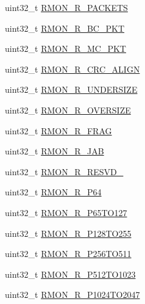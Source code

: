 \begin{DoxyCompactItemize}
\item 
uint32\+\_\+t \hyperlink{struct_e_n_e_t___mem_map_a64a6061bd900bcc9f6893b12220f8ed5}{R\+M\+O\+N\+\_\+\+R\+\_\+\+P\+A\+C\+K\+E\+T\+S}
\item 
uint32\+\_\+t \hyperlink{struct_e_n_e_t___mem_map_a3b1e0279007d57c1cfed8081face0169}{R\+M\+O\+N\+\_\+\+R\+\_\+\+B\+C\+\_\+\+P\+K\+T}
\item 
uint32\+\_\+t \hyperlink{struct_e_n_e_t___mem_map_af9ca1409d5ed35a1c48d9a254762b438}{R\+M\+O\+N\+\_\+\+R\+\_\+\+M\+C\+\_\+\+P\+K\+T}
\item 
uint32\+\_\+t \hyperlink{struct_e_n_e_t___mem_map_a5ccf7fdc501a4680af746af378cf6ea8}{R\+M\+O\+N\+\_\+\+R\+\_\+\+C\+R\+C\+\_\+\+A\+L\+I\+G\+N}
\item 
uint32\+\_\+t \hyperlink{struct_e_n_e_t___mem_map_acf83d964c8f7e3a50038bd1a5b488378}{R\+M\+O\+N\+\_\+\+R\+\_\+\+U\+N\+D\+E\+R\+S\+I\+Z\+E}
\item 
uint32\+\_\+t \hyperlink{struct_e_n_e_t___mem_map_a0519d6cb1049fe7cb867b1ede8957240}{R\+M\+O\+N\+\_\+\+R\+\_\+\+O\+V\+E\+R\+S\+I\+Z\+E}
\item 
uint32\+\_\+t \hyperlink{struct_e_n_e_t___mem_map_ad993f3d9dafb62d47cd013e91b2c5205}{R\+M\+O\+N\+\_\+\+R\+\_\+\+F\+R\+A\+G}
\item 
uint32\+\_\+t \hyperlink{struct_e_n_e_t___mem_map_afee0196ea0df5462fc302a66a2978703}{R\+M\+O\+N\+\_\+\+R\+\_\+\+J\+A\+B}
\item 
uint32\+\_\+t \hyperlink{struct_e_n_e_t___mem_map_a2b2e76382397765dc17649102ba96c3f}{R\+M\+O\+N\+\_\+\+R\+\_\+\+R\+E\+S\+V\+D\+\_}
\item 
uint32\+\_\+t \hyperlink{struct_e_n_e_t___mem_map_a3bd678a87a37ddd0a65afd0fcc4cc6d1}{R\+M\+O\+N\+\_\+\+R\+\_\+\+P64}
\item 
uint32\+\_\+t \hyperlink{struct_e_n_e_t___mem_map_af28ed1d2b882b6c0335d4c04a0c1ac2c}{R\+M\+O\+N\+\_\+\+R\+\_\+\+P65\+T\+O127}
\item 
uint32\+\_\+t \hyperlink{struct_e_n_e_t___mem_map_aedabd39592fecde58ed77f69468a34a0}{R\+M\+O\+N\+\_\+\+R\+\_\+\+P128\+T\+O255}
\item 
uint32\+\_\+t \hyperlink{struct_e_n_e_t___mem_map_a2f120e220238a9e7ffea616be9277d07}{R\+M\+O\+N\+\_\+\+R\+\_\+\+P256\+T\+O511}
\item 
uint32\+\_\+t \hyperlink{struct_e_n_e_t___mem_map_a63eddfbc250571ccb66870db72338ff3}{R\+M\+O\+N\+\_\+\+R\+\_\+\+P512\+T\+O1023}
\item 
uint32\+\_\+t \hyperlink{struct_e_n_e_t___mem_map_aaaa7843777b1e6655435adc36b7b8f35}{R\+M\+O\+N\+\_\+\+R\+\_\+\+P1024\+T\+O2047}

\end{DoxyCompactItemize}

